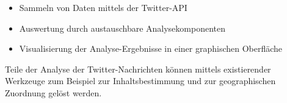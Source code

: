 \begin{itemize}
	\item Sammeln von Daten mittels der Twitter-API
	\item Auswertung durch austauschbare Analysekomponenten
	\item Visualisierung der Analyse-Ergebnisse in einer graphischen Oberfläche
\end{itemize}
Teile der Analyse der Twitter-Nachrichten können mittels existierender Werkzeuge zum Beispiel zur Inhaltsbestimmung und zur geographischen Zuordnung gelöst werden.\\\\

